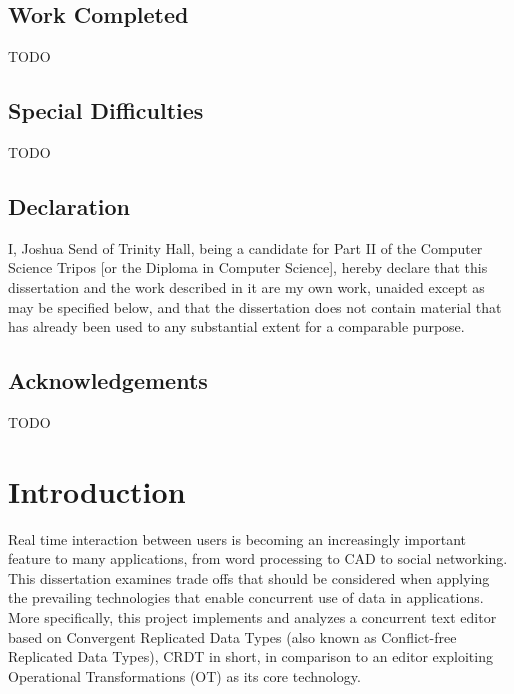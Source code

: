 \documentclass[12pt,a4paper,twoside,openright]{report}
\begin{document}
\section*{Work Completed}

TODO

\section*{Special Difficulties}

TODO
 
\newpage
\section*{Declaration}

I, Joshua Send of Trinity Hall, being a candidate for Part II of the Computer
Science Tripos [or the Diploma in Computer Science], hereby declare
that this dissertation and the work described in it are my own work,
unaided except as may be specified below, and that the dissertation
does not contain material that has already been used to any substantial
extent for a comparable purpose.

\bigskip
{}

\medskip
{}

\tableofcontents

\listoffigures

\newpage
\section*{Acknowledgements}

TODO


\pagestyle{headings}

\chapter{Introduction}

Real time interaction between users is becoming an increasingly important feature to many applications, from word processing to CAD to social networking. This dissertation examines trade offs that should be considered when applying the prevailing technologies that enable concurrent use of data in applications. More specifically, this project implements and analyzes a concurrent text editor based on Convergent Replicated Data Types (also known as Conflict-free Replicated Data Types), CRDT in short, in comparison to an editor exploiting Operational Transformations (OT) as its core technology.
\end{document}
